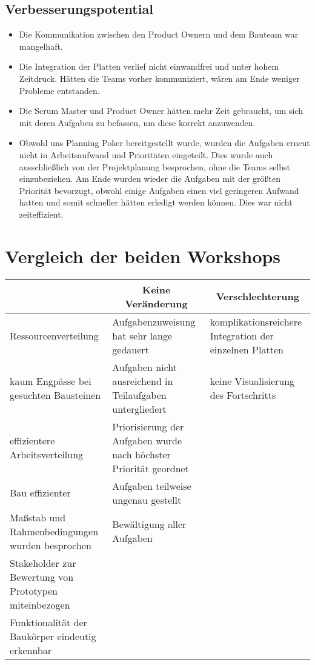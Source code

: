\documentclass[a4paper, 11pt]{article}
\begin{document}
\subsection{Verbesserungspotential} 
\begin{itemize}
    \item Die Kommunikation zwischen den Product Ownern und dem Bauteam war mangelhaft.
    \item Die Integration der Platten verlief nicht einwandfrei und unter hohem Zeitdruck. Hätten die Teams vorher kommuniziert, wären am Ende weniger Probleme entstanden.
    \item Die Scrum Master und Product Owner hätten mehr Zeit gebraucht, um sich mit deren Aufgaben zu befassen, um diese korrekt anzuwenden.
    \item Obwohl uns Planning Poker bereitgestellt wurde, wurden die Aufgaben erneut nicht in Arbeitsaufwand und Prioritäten eingeteilt. Dies wurde auch ausschließlich von der Projektplanung besprochen, ohne die Teams selbst einzubeziehen. Am Ende wurden wieder die Aufgaben mit der größten Priorität bevorzugt, obwohl einige Aufgaben einen viel geringeren Aufwand hatten und somit schneller hätten erledigt werden können. Dies war nicht zeiteffizient.
\end{itemize}
\pagebreak



\section {Vergleich der beiden Workshops}
\begin{table}[h]
    \centering
    \renewcommand{\arraystretch}{1.3}
    \begin{tabular}{| p{5cm} | p{5cm} | p{5cm} |}
        \hline
        \rowcolor{Gray} 
        \multicolumn{1}{|c|}{\textbf{Verbesserung}} & \multicolumn{1}{c|}{\textbf{Keine Veränderung}} & \multicolumn{1}{c|}{\textbf{Verschlechterung}} \\
        \hline
        Ressourcenverteilung & Aufgabenzuweisung hat sehr lange gedauert & komplikationsreichere Integration der einzelnen Platten \\
        \hline
        kaum Engpässe bei gesuchten Bausteinen & Aufgaben nicht ausreichend in Teilaufgaben untergliedert & keine Visualisierung des Fortschritts \\
        \hline
        effizientere Arbeitsverteilung & Priorisierung der Aufgaben wurde nach höchster Priorität geordnet & \\
        \hline
        Bau effizienter & Aufgaben teilweise ungenau gestellt & \\
        \hline
        Maßstab und Rahmenbedingungen wurden besprochen & Bewältigung aller Aufgaben & \\
        \hline
        Stakeholder zur Bewertung von Prototypen miteinbezogen & & \\
        \hline
        Funktionalität der Baukörper eindeutig erkennbar & & \\
        \hline
    \end{tabular}
\end{table}
\pagebreak
\end{document}
